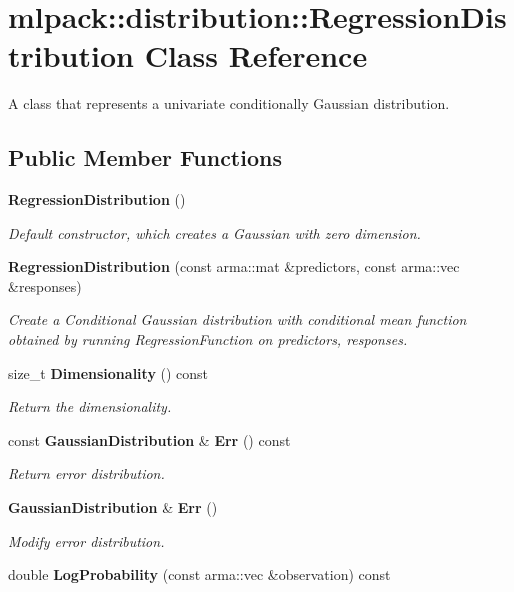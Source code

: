 \section{mlpack\+:\+:distribution\+:\+:Regression\+Distribution Class Reference}
\label{classmlpack_1_1distribution_1_1RegressionDistribution}


A class that represents a univariate conditionally Gaussian distribution.  


\subsection*{Public Member Functions}
\begin{DoxyCompactItemize}
\item 
{\bf Regression\+Distribution} ()
\begin{DoxyCompactList}\small\item\em Default constructor, which creates a Gaussian with zero dimension. \end{DoxyCompactList}\item 
{\bf Regression\+Distribution} (const arma\+::mat \&predictors, const arma\+::vec \&responses)
\begin{DoxyCompactList}\small\item\em Create a Conditional Gaussian distribution with conditional mean function obtained by running Regression\+Function on predictors, responses. \end{DoxyCompactList}\item 
size\+\_\+t {\bf Dimensionality} () const 
\begin{DoxyCompactList}\small\item\em Return the dimensionality. \end{DoxyCompactList}\item 
const {\bf Gaussian\+Distribution} \& {\bf Err} () const 
\begin{DoxyCompactList}\small\item\em Return error distribution. \end{DoxyCompactList}\item 
{\bf Gaussian\+Distribution} \& {\bf Err} ()
\begin{DoxyCompactList}\small\item\em Modify error distribution. \end{DoxyCompactList}\item 
double {\bf Log\+Probability} (const arma\+::vec \&observation) const 

\end{DoxyCompactItemize}
